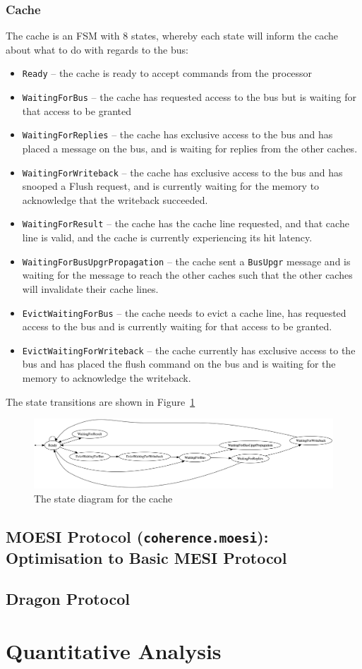 \documentclass[nonacm,acmsmall,screen,11pt]{acmart}
\begin{document}
\subsubsection{Cache}
The cache is an FSM with 8 states, whereby each state will inform the cache about what to do with regards to the bus:
\begin{itemize}
  \item \texttt{Ready} -- the cache is ready to accept commands from the processor
  \item \texttt{WaitingForBus} -- the cache has requested access to the bus but is waiting for that access to be granted
  \item \texttt{WaitingForReplies} -- the cache has exclusive access to the bus and has placed a message on the bus, and is waiting for replies from the other caches.
  \item \texttt{WaitingForWriteback} -- the cache has exclusive access to the bus and has snooped a Flush request, and is currently waiting for the memory to acknowledge that the writeback succeeded.
  \item \texttt{WaitingForResult} -- the cache has the cache line requested, and that cache line is valid, and the cache is currently experiencing its hit latency.
  \item \texttt{WaitingForBusUpgrPropagation} -- the cache sent a \texttt{BusUpgr} message and is waiting for the message to reach the other caches such that the other caches will invalidate their cache lines.
  \item \texttt{EvictWaitingForBus} -- the cache needs to evict a cache line, has requested access to the bus and is currently waiting for that access to be granted.
  \item \texttt{EvictWaitingForWriteback} -- the cache currently has exclusive access to the bus and has placed the flush command on the bus and is waiting for the memory to acknowledge the writeback.
\end{itemize}

The state transitions are shown in Figure~\ref{fig:mesi_cache}

\begin{figure}[hptb]
  \centering
  \includegraphics[width=\textwidth]{mesi_cache}
  \caption{The state diagram for the cache}
  \label{fig:mesi_cache}
\end{figure}

\subsection{MOESI Protocol (\texttt{coherence.moesi}): Optimisation to Basic MESI Protocol}
\cite{microelectronics1997ultrasparc}

\subsection{Dragon Protocol}

\section{Quantitative Analysis}




\end{document}
